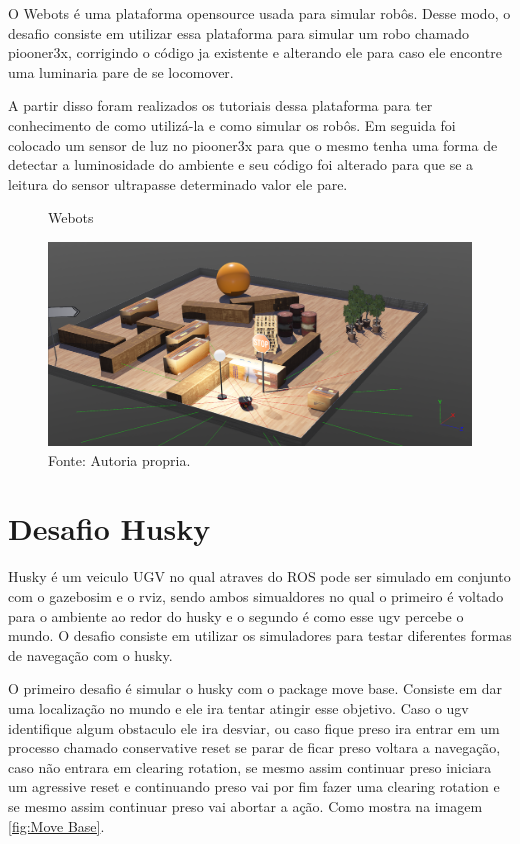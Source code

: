 O Webots é uma plataforma opensource usada para simular robôs. 
Desse modo, o desafio consiste em utilizar essa plataforma para 
simular um robo chamado piooner3x, corrigindo o código ja existente
e alterando ele para caso ele encontre uma luminaria pare de se locomover.

A partir disso foram realizados os tutoriais dessa plataforma para 
ter conhecimento de como utilizá-la e como simular os robôs. 
Em seguida foi colocado um sensor de luz no piooner3x para que 
o mesmo tenha uma forma de detectar a luminosidade do ambiente
e seu código foi alterado para que se a leitura do sensor 
ultrapasse determinado valor ele pare.

\begin{figure}[h!]
    \centering
    \caption{Webots}
    \includegraphics[width=1\textwidth]{Figures/webots3.png}
    \caption*{Fonte: Autoria propria.}
    \label{fig:Webots}
\end{figure}


\section{Desafio Husky}
Husky é um veiculo UGV no qual atraves do ROS pode ser 
simulado em conjunto com o gazebosim e o rviz, sendo ambos
simualdores no qual o primeiro é voltado para o ambiente 
ao redor do husky e o segundo é como esse ugv percebe o mundo.
O desafio consiste em utilizar os simuladores para testar
diferentes formas de navegação com o husky.

O primeiro desafio é simular o husky com o package move base. 
Consiste em dar uma localização no mundo e ele ira tentar atingir 
esse objetivo. Caso o ugv identifique algum obstaculo ele ira desviar,
ou caso fique preso ira entrar em um processo chamado conservative reset
se parar de ficar preso voltara a navegação, caso não entrara em 
clearing rotation, se mesmo assim continuar preso iniciara um agressive reset
e continuando preso vai por fim fazer uma clearing rotation e se mesmo 
assim continuar preso vai abortar a ação. Como mostra na imagem \ref{fig:Move Base}.


